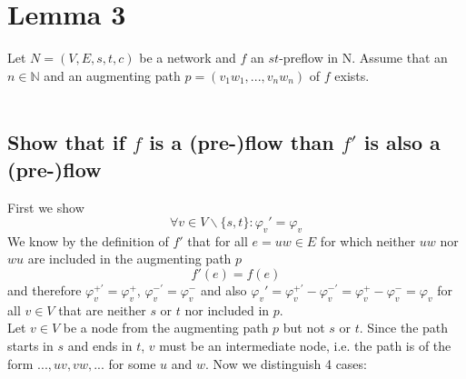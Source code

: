 \documentclass[10pt,a4paper]{article}
\begin{document}
	\section{Lemma 3}
	Let $N = (V, E, s, t, c)$ be a network  and $f$ an $st$-preflow in N.  Assume that an $n \in \mathbb{N}$  and an  augmenting path $p = (v_1w_1, ... ,v_nw_n)$ of $f$ exists. \\\\
	
	\subsection*{Show that if $f$ is a (pre-)flow than $f'$ is also a (pre-)flow}
	First we show
	\begin{equation}
	\label{eq:flux_same}
	\forall v \in V\backslash\{s,t\}: \varphi_v' = \varphi_v
	\end{equation}
	We know by the definition of $f'$ that for all $e = uw\in E$ for which neither $uw$ nor $wu$ are included in the augmenting path $p$
	$$f'(e) = f(e)$$
	and therefore $\varphi_v^{+\prime}  = \varphi_v^{+} $, $\varphi_v^{-\prime} = \varphi_v^-$ and also $\varphi_v' = \varphi_v^{+\prime} - \varphi_v^{-\prime} = \varphi_v^+ - \varphi_v^- = \varphi_v$ for all $v \in V$ that are neither $s$ or $t$ nor included in $p$. \\
	Let $v \in V$ be a node from the augmenting path $p$ but not $s$ or $t$. Since the path starts in $s$ and ends in $t$, $v$ must be an intermediate node, i.e. the path is of the form $..., uv, vw,...$ for some $u$ and $w$.  Now we distinguish 4 cases:
\end{document}
